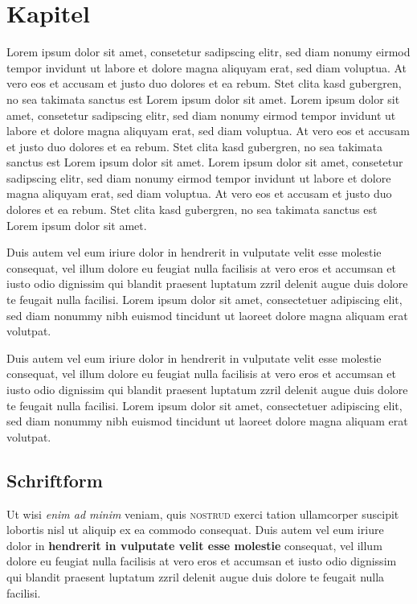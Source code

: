 \chapter{Kapitel}
Lorem ipsum dolor sit amet, consetetur sadipscing elitr, sed diam nonumy eirmod tempor invidunt ut labore et dolore magna aliquyam erat, sed diam voluptua. At vero eos et accusam et justo duo dolores et ea rebum. Stet clita kasd gubergren, no sea takimata sanctus est Lorem ipsum dolor sit amet. Lorem ipsum dolor sit amet, consetetur sadipscing elitr, sed diam nonumy eirmod tempor invidunt ut labore et dolore magna aliquyam erat, sed diam voluptua. At vero eos et accusam et justo duo dolores et ea rebum. Stet clita kasd gubergren, no sea takimata sanctus est Lorem ipsum dolor sit amet. Lorem ipsum dolor sit amet, consetetur sadipscing elitr, sed diam nonumy eirmod tempor invidunt ut labore et dolore magna aliquyam erat, sed diam voluptua. At vero eos et accusam et justo duo dolores et ea rebum. Stet clita kasd gubergren, no sea takimata sanctus est Lorem ipsum dolor sit amet.   

Duis autem vel eum iriure dolor in hendrerit in vulputate velit esse molestie consequat, vel illum dolore eu feugiat nulla facilisis at vero eros et accumsan et iusto odio dignissim qui blandit praesent luptatum zzril delenit augue duis dolore te feugait nulla facilisi. Lorem ipsum dolor sit amet, consectetuer adipiscing elit, sed diam nonummy nibh euismod tincidunt ut laoreet dolore magna aliquam erat volutpat.   

Duis autem vel eum iriure dolor in hendrerit in vulputate velit esse molestie consequat, vel illum dolore eu feugiat nulla facilisis at vero eros et accumsan et iusto odio dignissim qui blandit praesent luptatum zzril delenit augue duis dolore te feugait nulla facilisi. Lorem ipsum dolor sit amet, consectetuer adipiscing elit, sed diam nonummy nibh euismod tincidunt ut laoreet dolore magna aliquam erat volutpat.   

\section{Schriftform}
Ut wisi \textit{enim ad minim} veniam, quis \textsc{nostrud} exerci tation ullamcorper suscipit lobortis nisl ut aliquip ex ea commodo consequat. Duis autem vel eum iriure dolor in \textbf{hendrerit in vulputate velit esse molestie} consequat, vel illum dolore eu feugiat nulla facilisis at vero eros et accumsan et iusto odio dignissim qui \LARGE blandit praesent luptatum \normalsize zzril delenit augue duis dolore te feugait nulla facilisi.   

